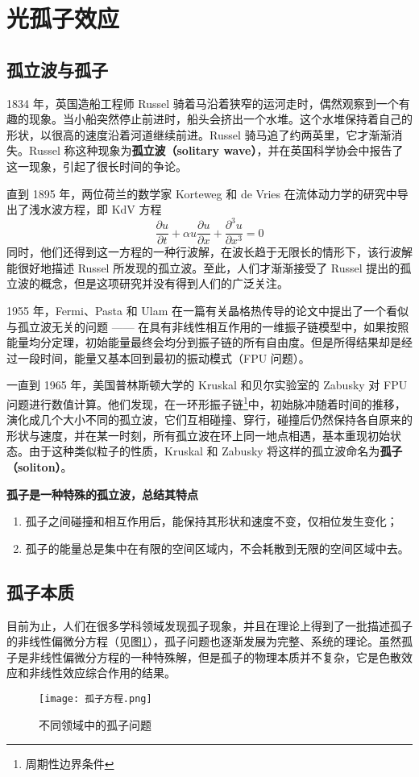 \section{光孤子效应}
\label{sec:optical soliton}
\subsection{孤立波与孤子}
1834 年，英国造船工程师 Russel 骑着马沿着狭窄的运河走时，偶然观察到一个有趣的现象\cite{liangkunmiao}。当小船突然停止前进时，船头会挤出一个水堆。这个水堆保持着自己的形状，以很高的速度沿着河道继续前进。Russel 骑马追了约两英里，它才渐渐消失。Russel 称这种现象为{\bfseries 孤立波（solitary wave）}，并在英国科学协会中报告了这一现象，引起了很长时间的争论。

直到 1895 年，两位荷兰的数学家 Korteweg 和 de Vries 在流体动力学的研究中导出了浅水波方程\cite{liangkunmiao}，即 KdV 方程
\begin{equation}
    \frac{\partial u}{\partial t}+\alpha u\frac{\partial u}{\partial x}+\frac{\partial^3 u}{\partial x^3}=0
\end{equation}
同时，他们还得到这一方程的一种行波解，在波长趋于无限长的情形下，该行波解能很好地描述 Russel 所发现的孤立波。至此，人们才渐渐接受了 Russel 提出的孤立波的概念，但是这项研究并没有得到人们的广泛关注。

1955 年，Fermi、Pasta 和 Ulam 在一篇有关晶格热传导的论文中提出了一个看似与孤立波无关的问题 —— 在具有非线性相互作用的一维振子链模型中，如果按照能量均分定理，初始能量最终会均分到振子链的所有自由度。但是所得结果却是经过一段时间，能量又基本回到最初的振动模式（FPU 问题）\cite{liangkunmiao}。

一直到 1965 年，美国普林斯顿大学的 Kruskal 和贝尔实验室的 Zabusky 对 FPU 问题进行数值计算。他们发现，在一环形振子链\footnote{周期性边界条件}中，初始脉冲随着时间的推移，演化成几个大小不同的孤立波，它们互相碰撞、穿行，碰撞后仍然保持各自原来的形状与速度，并在某一时刻，所有孤立波在环上同一地点相遇，基本重现初始状态。由于这种类似粒子的性质，Kruskal 和 Zabusky 将这样的孤立波命名为{\bfseries 孤子（soliton）}。{\bfseries 孤子是一种特殊的孤立波，总结其特点\cite{yangbojun,liangkunmiao}
\begin{enumerate}[label=(\arabic*)]
    \item 孤子之间碰撞和相互作用后，能保持其形状和速度不变，仅相位发生变化；
    \item 孤子的能量总是集中在有限的空间区域内，不会耗散到无限的空间区域中去。
\end{enumerate}}

\subsection{孤子本质}
\label{sec:soliton}
目前为止，人们在很多学科领域发现孤子现象，并且在理论上得到了一批描述孤子的非线性偏微分方程（见图\ref{fig:soliton-eq}），孤子问题也逐渐发展为完整、系统的理论。虽然孤子是非线性偏微分方程的一种特殊解，但是孤子的物理本质并不复杂，它是色散效应和非线性效应综合作用的结果。
\begin{figure}[tbp]
    \centering
    \texttt{[image: 孤子方程.png]}
    \caption{不同领域中的孤子问题}
    \label{fig:soliton-eq}
\end{figure}

